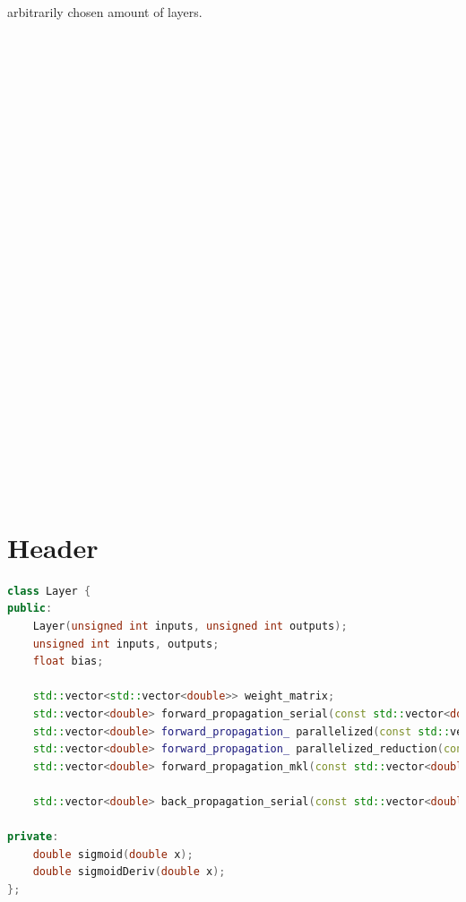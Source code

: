 \documentclass[12pt, twocolumn]{report}
\begin{document}
arbitrarily chosen amount of layers.
\\ \\ \\ \\ \\ \\ \\ \\ \\ \\ \\ \\ \\ \\ \\ \\ \\ \\ \\ \\ \\ \\ \\ \\ \\ \\ \\ \\
\section*{Header}
\begin{lstlisting}[language=C++, caption={Layer Class Implementation}]
class Layer {
public:
    Layer(unsigned int inputs, unsigned int outputs);
    unsigned int inputs, outputs;
    float bias;

    std::vector<std::vector<double>> weight_matrix;
    std::vector<double> forward_propagation_serial(const std::vector<double>& input_vector);
    std::vector<double> forward_propagation_ parallelized(const std::vector<double>& input_vector);
    std::vector<double> forward_propagation_ parallelized_reduction(const std::vector<double>& input_vector);
    std::vector<double> forward_propagation_mkl(const std::vector<double>& input_vector);

    std::vector<double> back_propagation_serial(const std::vector<double>& input, const std::vector<double>& error, double learningRate);

private:
    double sigmoid(double x);
    double sigmoidDeriv(double x);
};

\end{lstlisting}
\end{document}
